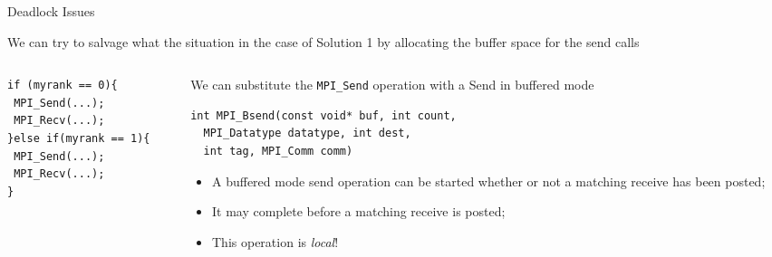 \documentclass[xcolor={svgnames,usenames}]{beamer}
\begin{document}
\begin{frame}[fragile]{Deadlock Issues}

We can try to salvage what the situation in the case of Solution 1 by allocating the buffer space for the send calls
\vfill
\begin{columns}
\begin{column}{0.3\columnwidth}
{\footnotesize
\begin{verbatim}
if (myrank == 0){
 MPI_Send(...);
 MPI_Recv(...);
}else if(myrank == 1){
 MPI_Send(...); 
 MPI_Recv(...);
}
\end{verbatim}
}
\end{column}
\begin{column}{0.7\columnwidth}
\noindent We can substitute the \texttt{MPI_Send} operation with a Send in buffered mode
{\footnotesize
\begin{verbatim}
int MPI_Bsend(const void* buf, int count, 
  MPI_Datatype datatype, int dest,
  int tag, MPI_Comm comm)
\end{verbatim}
}
\begin{itemize}
\item A buffered mode send operation can be started whether or not a matching receive
has been posted;
\item It may complete before a matching receive is posted;
\item This operation is \emph{local}!
\end{itemize}
\end{column}
\end{columns}

\end{frame}
\end{document}
